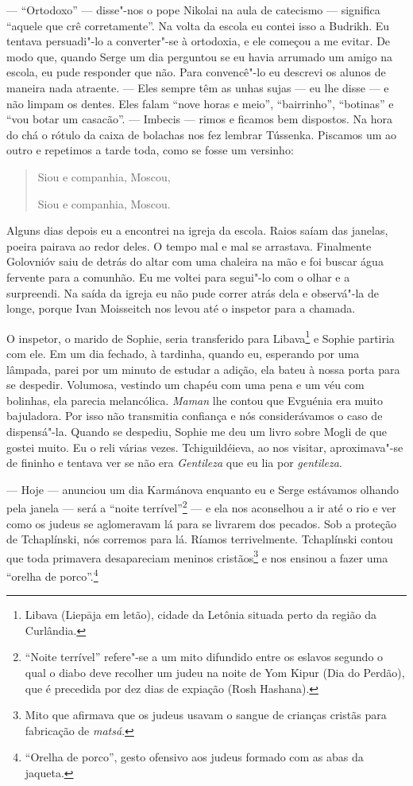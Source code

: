--- ``Ortodoxo'' --- disse"-nos o pope Nikolai na aula de catecismo ---
significa ``aquele que crê corretamente''. Na volta da escola eu contei
isso a Budrikh. Eu tentava persuadi"-lo a converter"-se à ortodoxia, e ele
começou a me evitar. De modo que, quando Serge um dia perguntou se eu
havia arrumado um amigo na escola, eu pude responder que não. Para
convencê"-lo eu descrevi os alunos de maneira nada atraente. --- Eles
sempre têm as unhas sujas --- eu lhe disse --- e não limpam os dentes.
Eles falam ``nove horas e meio'', ``bairrinho'', ``botinas'' e ``vou
botar um casacão''. --- Imbecis --- rimos e ficamos bem dispostos. Na
hora do chá o rótulo da caixa de bolachas nos fez lembrar Tússenka.
Piscamos um ao outro e repetimos a tarde toda, como se fosse um
versinho:

\begin{quotation}
Siou e companhia, Moscou,

Siou e companhia, Moscou.
\end{quotation}

Alguns dias depois eu a encontrei na igreja da escola. Raios saíam das
janelas, poeira pairava ao redor deles. O tempo mal e mal se arrastava.
Finalmente Golovnióv saiu de detrás do altar com uma chaleira na mão e
foi buscar água fervente para a comunhão. Eu me voltei para segui"-lo com
o olhar e a surpreendi. Na saída da igreja eu não pude correr atrás dela
e observá"-la de longe, porque Ivan Moisseitch nos levou até o inspetor
para a chamada.

O inspetor, o marido de Sophie, seria transferido para Libava\footnote{Libava
  (Liepāja em letão), cidade da Letônia situada perto da região da
  Curlândia.} e Sophie partiria com ele. Em um dia fechado, à tardinha,
quando eu, esperando por uma lâmpada, parei por um minuto de estudar a
adição, ela bateu à nossa porta para se despedir. Volumosa, vestindo um
chapéu com uma pena e um véu com bolinhas, ela parecia melancólica.
\emph{Maman} lhe contou que Evguénia era muito bajuladora. Por isso não
transmitia confiança e nós considerávamos o caso de dispensá"-la. Quando
se despediu, Sophie me deu um livro sobre Mogli de que gostei muito. Eu
o reli várias vezes. Tchiguildéieva, ao nos visitar, aproximava"-se de
fininho e tentava ver se não era \emph{Gentileza} que eu lia por
\emph{gentileza}.

--- Hoje --- anunciou um dia Karmánova enquanto eu e Serge estávamos
olhando pela janela --- será a ``noite terrível''\footnote{``Noite
  terrível'' refere"-se a um mito difundido entre os eslavos segundo o
  qual o diabo deve recolher um judeu na noite de Yom Kipur (Dia do
  Perdão), que é precedida por dez dias de expiação (Rosh Hashana).} ---
e ela nos aconselhou a ir até o rio e ver como os judeus se aglomeravam
lá para se livrarem dos pecados. Sob a proteção de Tchaplínski, nós
corremos para lá. Ríamos terrivelmente. Tchaplínski contou que toda
primavera desapareciam meninos cristãos\footnote{Mito que afirmava que
  os judeus usavam o sangue de crianças cristãs para fabricação de
  \emph{matsá}.} e nos ensinou a fazer uma ``orelha de
porco''.\footnote{``Orelha de porco'', gesto ofensivo aos judeus formado
  com as abas da jaqueta.}

